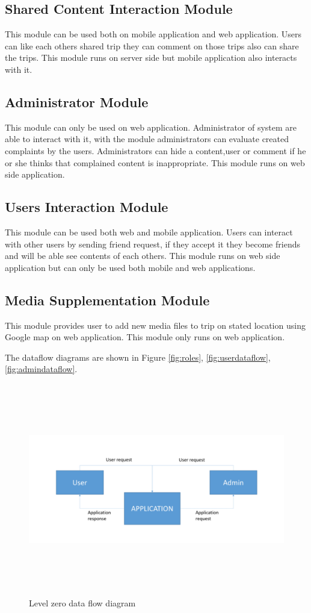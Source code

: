 \subsection{Shared Content Interaction Module}    
This module can be used both on mobile application and web application. Users can like each others shared trip they can comment on those trips also can share the trips. This module runs on server side but mobile application also interacts with it.

\subsection{Administrator Module}
This module can only be used on web application. Administrator of system are able to interact with it, with the module administrators can evaluate created complaints by the users. Administrators can hide a content,user or comment if he or she thinks that complained content is inappropriate. This module runs on web side application.

\subsection{Users Interaction Module}
This module can be used both web and mobile application. Users can interact with other users by sending friend request, if they accept it they become friends and will be able see contents of each others. This module runs on web side application but can only be used both mobile and web applications.

\subsection{Media Supplementation Module}
This module provides user to add new media files to trip on stated location using Google map on web application. This module only runs on web application.


The dataflow diagrams are shown in Figure \ref{fig:roles}, \ref{fig:userdataflow}, \ref{fig:admindataflow}.


\begin{figure}[!htbp]
\centering
\includegraphics[width=\textwidth, height= 25em]{projectChapters/images/dataflow.png}
\caption{Level zero data flow diagram}
\label{fig:dataflow}
\end{figure}

